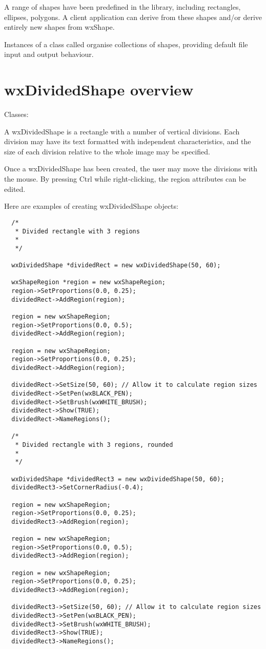 A range of shapes have been predefined in the library, including rectangles, ellipses,
polygons. A client application can derive from these shapes and/or derive entirely
new shapes from wxShape.

Instances of a class called  organise collections of
shapes, providing default file input and output behaviour.


\section{wxDividedShape overview}\label{dividedshapeoverview}

Classes: 

A wxDividedShape is a rectangle with a number of vertical divisions. Each
division may have its text formatted with independent characteristics, and
the size of each division relative to the whole image may be specified.

Once a wxDividedShape has been created, the user may move the divisions with the
mouse. By pressing Ctrl while right-clicking, the region attributes can be edited.

Here are examples of creating wxDividedShape objects:

{\small
\begin{verbatim}
  /*
   * Divided rectangle with 3 regions
   *
   */

  wxDividedShape *dividedRect = new wxDividedShape(50, 60);

  wxShapeRegion *region = new wxShapeRegion;
  region->SetProportions(0.0, 0.25);
  dividedRect->AddRegion(region);

  region = new wxShapeRegion;
  region->SetProportions(0.0, 0.5);
  dividedRect->AddRegion(region);

  region = new wxShapeRegion;
  region->SetProportions(0.0, 0.25);
  dividedRect->AddRegion(region);
  
  dividedRect->SetSize(50, 60); // Allow it to calculate region sizes
  dividedRect->SetPen(wxBLACK_PEN);
  dividedRect->SetBrush(wxWHITE_BRUSH);
  dividedRect->Show(TRUE);
  dividedRect->NameRegions();

  /*
   * Divided rectangle with 3 regions, rounded
   *
   */

  wxDividedShape *dividedRect3 = new wxDividedShape(50, 60);
  dividedRect3->SetCornerRadius(-0.4);

  region = new wxShapeRegion;
  region->SetProportions(0.0, 0.25);
  dividedRect3->AddRegion(region);

  region = new wxShapeRegion;
  region->SetProportions(0.0, 0.5);
  dividedRect3->AddRegion(region);

  region = new wxShapeRegion;
  region->SetProportions(0.0, 0.25);
  dividedRect3->AddRegion(region);
  
  dividedRect3->SetSize(50, 60); // Allow it to calculate region sizes
  dividedRect3->SetPen(wxBLACK_PEN);
  dividedRect3->SetBrush(wxWHITE_BRUSH);
  dividedRect3->Show(TRUE);
  dividedRect3->NameRegions();
\end{verbatim}
}


